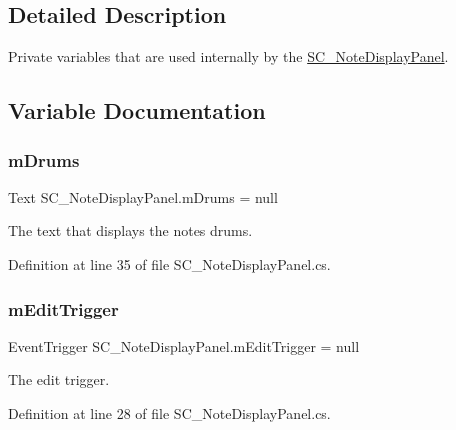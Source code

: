 \subsection{Detailed Description}
Private variables that are used internally by the \hyperlink{class_s_c___note_display_panel}{S\+C\+\_\+\+Note\+Display\+Panel}. 

\subsection{Variable Documentation}
\mbox{\label{group___s_c___n_d_p_priv_var_gadd38ff2acddedee4b6165f2fc48fd43c}} 
\subsubsection{\texorpdfstring{m\+Drums}{mDrums}}
{\footnotesize\ttfamily Text S\+C\+\_\+\+Note\+Display\+Panel.\+m\+Drums = null\hspace{0.3cm}{\ttfamily [private]}}



The text that displays the note\textquotesingle{}s drums. 



Definition at line 35 of file S\+C\+\_\+\+Note\+Display\+Panel.\+cs.

\mbox{\label{group___s_c___n_d_p_priv_var_ga3dd3e8ce9fbbe9b6b11d87e28df7dcfa}} 
\subsubsection{\texorpdfstring{m\+Edit\+Trigger}{mEditTrigger}}
{\footnotesize\ttfamily Event\+Trigger S\+C\+\_\+\+Note\+Display\+Panel.\+m\+Edit\+Trigger = null\hspace{0.3cm}{\ttfamily [private]}}



The edit trigger. 



Definition at line 28 of file S\+C\+\_\+\+Note\+Display\+Panel.\+cs.

\mbox{\label{group___s_c___n_d_p_priv_var_ga611f26eaf6a960570b0dd848b6712b5f}} 
